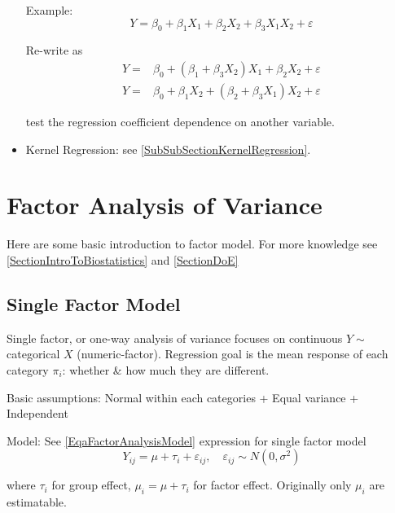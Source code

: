 \begin{itemize}[topsep=2pt,itemsep=0pt]
    Example: 
    \begin{equation}
        Y=\beta _0+\beta _1X_1+\beta _2X_2+\beta _{3}X_1X_2+\varepsilon  
    \end{equation}
    
    Re-write as
    \begin{align}
        Y=&\beta _0+(\beta _1+\beta _3X_2)X_1+\beta _2X_2+\varepsilon \\
        Y=&\beta _0+\beta _1X_2+(\beta _2+\beta _3X_1)X_2+\varepsilon 
    \end{align}

    test the regression coefficient dependence on another variable.

    \item Kernel Regression: see \autoref{SubSubSectionKernelRegression}.

\end{itemize}
   
      





\section{Factor Analysis of Variance}\label{SubSectionLRAFactorANOVA}
Here are some basic introduction to factor model. For more knowledge see \autoref{SectionIntroToBiostatistics} and \autoref{SectionDoE}
\subsection{Single Factor Model}\label{SubSubSectionLRSingleFactorModel}
    Single factor, or one-way analysis of variance focuses on continuous $ Y \sim $ categorical $ X $ (numeric-factor). Regression goal is the mean response of each category $ \pi_i $: whether \& how much they are different.

    Basic assumptions: Normal within each categories + Equal variance + Independent

    Model: See \autoref{EqaFactorAnalysisModel} expression for single factor model
    \begin{equation}
        Y_{ij}=\mu+\tau_i+\varepsilon _{ij},\quad \varepsilon _{ij}\sim N(0,\sigma ^2)
    \end{equation}

    where $ \tau_i $ for group effect, $ \mu_i=\mu +\tau_i $ for factor effect. Originally only $ \mu_i $ are estimatable.

